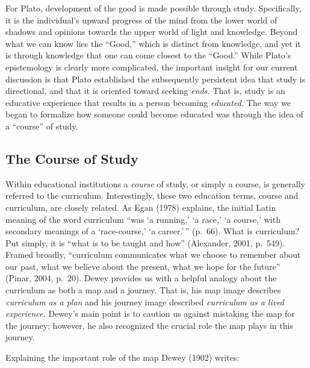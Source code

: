 \documentclass[
]{book}
\begin{document}
For Plato, development of the good is made possible through study. Specifically, it is the individual's upward progress of the mind from the lower world of shadows and opinions towards the upper world of light and knowledge. Beyond what we can know lies the ``Good,'' which is distinct from knowledge, and yet it is through knowledge that one can come closest to the ``Good.'' While Plato's epistemology is clearly more complicated, the important insight for our current discussion is that Plato established the subsequently persistent idea that study is directional, and that it is oriented toward seeking \emph{ends.} That is, study is an educative experience that results in a person becoming \emph{educated.} The way we began to formalize how someone could become educated was through the idea of a ``course'' of study.

\hypertarget{the-course-of-study}{%
\subsection*{The Course of Study}\label{the-course-of-study}}

Within educational institutions a \emph{course} of study, or simply a course, is generally referred to the curriculum. Interestingly, these two education terms, course and curriculum, are closely related. As Egan (1978) explains, the initial Latin meaning of the word curriculum ``was `a running,' `a race,' `a course,' with secondary meanings of a `race-course,' `a career.'\,'' (p.~66). What is curriculum? Put simply, it is ``what is to be taught and how'' (Alexander, 2001, p.~549). Framed broadly, ``curriculum communicates what we choose to remember about our past, what we believe about the present, what we hope for the future'' (Pinar, 2004, p.~20). Dewey provides us with a helpful analogy about the curriculum as both a map and a journey. That is, his map image describes \emph{curriculum as a plan} and his journey image described \emph{curriculum as a lived experience.} Dewey's main point is to caution us against mistaking the map for the journey; however, he also recognized the crucial role the map plays in this journey.

Explaining the important role of the map Dewey (1902) writes:
\end{document}
